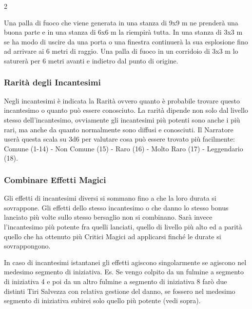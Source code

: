 \begin{multicols}{2}
\begin{itemize}[leftmargin=*]
Una palla di fuoco che viene generata in una stanza di 9x9 m ne prenderà una buona parte e in una stanza di 6x6 m la riempirà tutta. In una stanza di 3x3 m se ha modo di uscire da una porta o una finestra continuerà la sua esplosione fino ad arrivare ai 6 metri di raggio. Una palla di fuoco in un corridoio di 3x3 m lo saturerà per 6 metri avanti e indietro dal punto di origine.

\end{itemize}

\subsubsection{Rarità degli Incantesimi}\label{magieraritaincantesimi}

Negli incantesimi è indicata la Rarità ovvero quanto è probabile trovare questo incantesimo o quanto può essere conosciuto. La rarità dipende non solo dal livello stesso dell'incantesimo, ovviamente gli incantesimi più potenti sono anche i più rari, ma anche da quanto normalmente sono diffusi e conosciuti. Il Narratore userà questa scala su 3d6 per valutare cosa può essere trovato più facilmente: %
Comune (1-14) - Non Comune (15) - Raro (16) - Molto Raro (17) - Leggendario (18).

\subsubsection{Combinare Effetti Magici}\label{magiecombinareeffettimagici}

Gli effetti di incantesimi diversi si sommano fino a che la loro durata si sovrappone. Gli effetti dello stesso incantesimo o che danno lo stesso bonus lanciato più volte sullo stesso bersaglio non si combinano. Sarà invece l'incantesimo più potente fra quelli lanciati, quello di livello più alto ed a parità quello che ha ottenuto più Critici Magici ad applicarsi finché le durate si sovrappongono.

In caso di incantesimi istantanei gli effetti agiscono singolarmente se agiscono nel medesimo segmento di iniziativa. Es. Se vengo colpito da un fulmine a segmento di iniziativa 4 e poi da un altro fulmine a segmento di iniziativa 8 farò due distinti Tiri Salvezza con relativa gestione del danno, se fossero nel medesimo segmento di iniziativa subirei solo quello più potente (vedi sopra).


\end{multicols}
